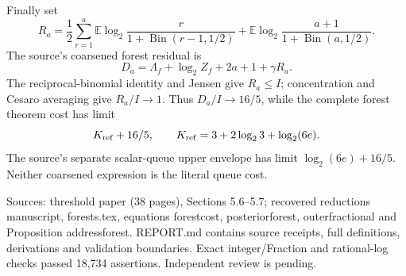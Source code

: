 \documentclass[11pt]{article}
\begin{document}
Finally set
\[
R_a=\frac12\sum_{r=1}^{a}\mathbb E\log_2\frac r{1+\operatorname{Bin}(r-1,1/2)}
+\mathbb E\log_2\frac{a+1}{1+\operatorname{Bin}(a,1/2)}.
\]
The source's coarsened forest residual is
\[
D_a=\Lambda_f+\log_2 Z_f+2a+1+\gamma R_a.
\]
The reciprocal-binomial identity and Jensen give $R_a\leq I$; concentration and Cesaro averaging give $R_a/I\to1$. Thus $D_a/I\to16/5$, while the complete forest theorem cost has limit
\[
K_{\rm ref}+16/5,\qquad K_{\rm ref}=3+2\log_2 3+\log_2(6e).
\]
The source's separate scalar-queue upper envelope has limit $\log_2(6e)+16/5$. Neither coarsened expression is the literal queue cost.

Sources: threshold paper (38 pages), Sections 5.6--5.7; recovered reductions manuscript, forests.tex, equations forestcost, posteriorforest, outerfractional and Proposition addressforest. REPORT.md contains source receipts, full definitions, derivations and validation boundaries. Exact integer/Fraction and rational-log checks passed 18,734 assertions. Independent review is pending.
\end{document}
